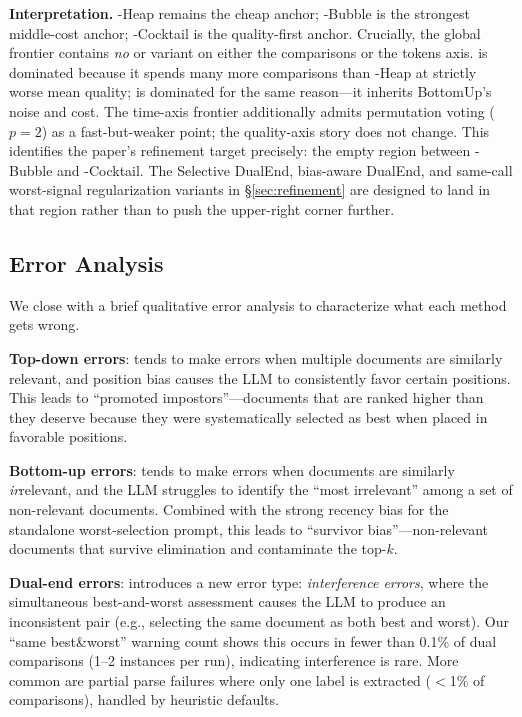 \textbf{Interpretation.}
\topdown{}-Heap remains the cheap anchor; \topdown{}-Bubble is the strongest middle-cost anchor; \dualend{}-Cocktail is the quality-first anchor. Crucially, the global frontier contains \emph{no} \bottomup{} or \bidir{} variant on either the comparisons or the tokens axis. \bottomup{} is dominated because it spends many more comparisons than \topdown{}-Heap at strictly worse mean quality; \bidir{} is dominated for the same reason---it inherits BottomUp's noise and cost. The time-axis frontier additionally admits permutation voting ($p{=}2$) as a fast-but-weaker point; the quality-axis story does not change. This identifies the paper's refinement target precisely: the empty region between \topdown{}-Bubble and \dualend{}-Cocktail. The Selective DualEnd, bias-aware DualEnd, and same-call worst-signal regularization variants in \S\ref{sec:refinement} are designed to land in that region rather than to push the upper-right corner further.


\subsection{Error Analysis}
\label{sec:errors}

We close with a brief qualitative error analysis to characterize what each method gets wrong.

\textbf{Top-down errors}: \topdown{} tends to make errors when multiple documents are similarly relevant, and position bias causes the LLM to consistently favor certain positions. This leads to ``promoted impostors''---documents that are ranked higher than they deserve because they were systematically selected as best when placed in favorable positions.

\textbf{Bottom-up errors}: \bottomup{} tends to make errors when documents are similarly \emph{ir}relevant, and the LLM struggles to identify the ``most irrelevant'' among a set of non-relevant documents. Combined with the strong recency bias for the standalone worst-selection prompt, this leads to ``survivor bias''---non-relevant documents that survive elimination and contaminate the top-$k$.

\textbf{Dual-end errors}: \dualend{} introduces a new error type: \emph{interference errors}, where the simultaneous best-and-worst assessment causes the LLM to produce an inconsistent pair (e.g., selecting the same document as both best and worst). Our ``same best\&worst'' warning count shows this occurs in fewer than 0.1\% of dual comparisons (1--2 instances per run), indicating interference is rare. More common are partial parse failures where only one label is extracted ($<$1\% of comparisons), handled by heuristic defaults.

